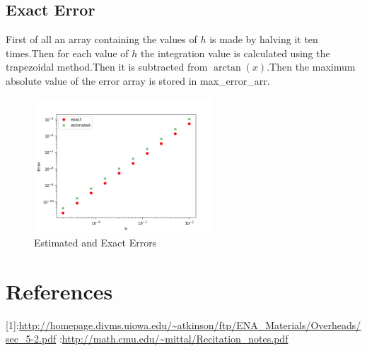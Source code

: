 \documentclass[11pt, a3paper]{article}
\begin{document}
\subsection{Exact Error}
First of all an array containing the values of $h$ is made by halving it ten times.Then for each value of $h$ the integration value is calculated using the trapezoidal method.Then it is subtracted from $\arctan(x)$.Then the maximum absolute value of the error array is stored in 
{\selectfont max\_error\_arr}.
\begin{figure}[h!]
  \includegraphics[width=0.6\textwidth, center]{Fig5.png}
  \caption{Estimated and Exact Errors}
\end{figure}

\section{References}
[1]:\url{http://homepage.divms.uiowa.edu/~atkinson/ftp/ENA_Materials/Overheads/sec_5-2.pdf}
\newline[2]:\url{http://math.cmu.edu/~mittal/Recitation_notes.pdf}
\end{document}
